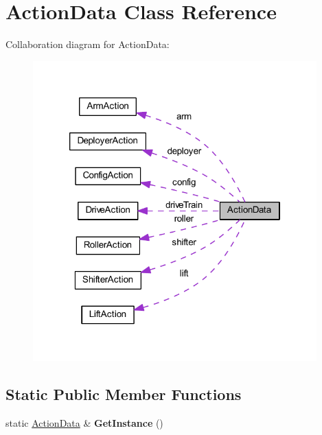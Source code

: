 \hypertarget{class_action_data}{
\section{\-Action\-Data \-Class \-Reference}
\label{class_action_data}
}


\-Collaboration diagram for \-Action\-Data\-:\nopagebreak
\begin{figure}[H]
\begin{center}
\leavevmode
\includegraphics[width=310pt]{class_action_data__coll__graph}
\end{center}
\end{figure}
\subsection*{\-Static \-Public \-Member \-Functions}
\begin{DoxyCompactItemize}
\item 
\hypertarget{class_action_data_a5a6c1f37d3e4273caf821ae681a42911}{
static \hyperlink{class_action_data}{\-Action\-Data} \& {\bfseries \-Get\-Instance} ()}
\label{class_action_data_a5a6c1f37d3e4273caf821ae681a42911}

\end{DoxyCompactItemize}
